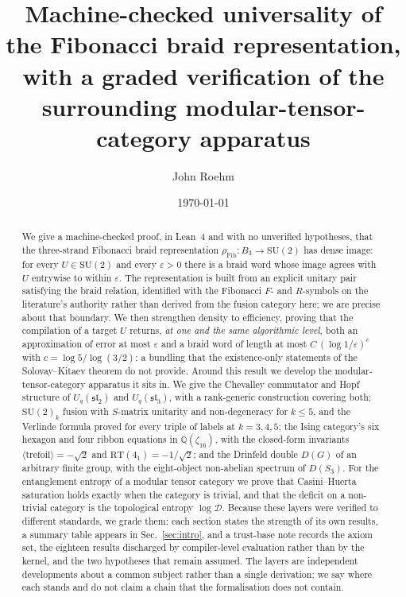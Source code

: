 \documentclass[aps,prx,nofootinbib,superscriptaddress,12pt]{revtex4-2}
\begin{document}
\title{Machine-checked universality of the Fibonacci braid representation,\\
with a graded verification of the surrounding modular-tensor-category apparatus}

\author{John Roehm}

\date{\today}

\begin{abstract}
We give a machine-checked proof, in Lean~4 and with no unverified
hypotheses, that the three-strand Fibonacci braid representation
$\rho_{\mathrm{Fib}}\colon B_3 \to \mathrm{SU}(2)$ has dense image: for
every $U \in \mathrm{SU}(2)$ and every $\varepsilon > 0$ there is a braid
word whose image agrees with $U$ entrywise to within $\varepsilon$. The
representation is built from an explicit unitary pair satisfying the
braid relation, identified with the Fibonacci $F$- and $R$-symbols on
the literature's authority rather than derived from the fusion category
here; we are precise about that boundary. We then strengthen density to
efficiency, proving that the compilation of a target $U$ returns,
\emph{at one and the same algorithmic level}, both an approximation of
error at most $\varepsilon$ and a braid word of length at most
$C\,(\log 1/\varepsilon)^{c}$ with $c = \log 5 / \log(3/2)$: a
bundling that the existence-only statements of the Solovay--Kitaev
theorem do not provide. Around this result we develop the
modular-tensor-category apparatus it sits in. We give the Chevalley
commutator and Hopf structure of $U_q(\mathfrak{sl}_2)$ and
$U_q(\mathfrak{sl}_3)$, with a rank-generic construction covering both;
$\mathrm{SU}(2)_k$ fusion with $S$-matrix unitarity and non-degeneracy
for $k \le 5$, and the Verlinde formula proved for every triple of
labels at $k = 3,4,5$; the Ising category's six hexagon and four ribbon
equations in $\mathbb{Q}(\zeta_{16})$, with the closed-form invariants
$\langle \mathrm{trefoil}\rangle = -\sqrt{2}$ and
$\mathrm{RT}(4_1) = -1/\sqrt{2}$; and the Drinfeld double $D(G)$ of an
arbitrary finite group, with the eight-object non-abelian spectrum of
$D(S_3)$. For the entanglement entropy of a modular tensor category we
prove that Casini--Huerta saturation holds exactly when the category is
trivial, and that the deficit on a non-trivial category is the
topological entropy $\log\mathcal{D}$.
Because these layers were verified to different standards, we grade
them: each section states the strength of its own results, a summary
table appears in Sec.~\ref{sec:intro}, and a trust-base note records the
axiom set, the eighteen results discharged by compiler-level evaluation
rather than by the kernel, and the two hypotheses that remain assumed.
The layers are independent developments about a common subject rather
than a single derivation; we say where each stands and do not claim a
chain that the formalisation does not contain.
\end{abstract}
\end{document}
